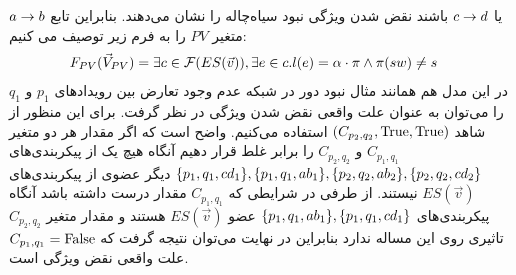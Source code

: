 $a \rightarrow b$
یا 
$c \rightarrow d$
باشند نقض شدن ویژگی نبود سیاه‌چاله را نشان می‌دهند.
بنابراین تابع متغیر
$PV$
را به فرم زیر توصیف می کنیم:
\begin{align*}
    F_{PV}(\vec V_{PV}) & = \exists c \in \mathcal{F}(ES(\vec v)),
    \exists e \in c. l(e) =  \alpha\cdot\pi \wedge \pi(sw) \neq s
\end{align*}
در این مدل هم همانند مثال نبود دور در شبکه عدم وجود تعارض بین رویداد‌های 
$p_1$
و
$q_1$
را می‌توان به عنوان علت واقعی نقض شدن ویژگی در نظر گرفت.
برای این منظور از شاهد
$(C_{p_2,q_2},\mathrm{True},\mathrm{True})$
استفاده می‌کنیم.
واضح است که اگر مقدار هر دو متغیر
$C_{p_1,q_1}$
و
$C_{p_2,q_2}$
را برابر غلط قرار دهیم آنگاه هیچ یک از پیکر‌بندی‌های 
$\{p_1,q_1,cd_1\},\{p_1,q_1,ab_1\},\{p_2,q_2,ab_2\},\{p_2,q_2,cd_2\}$
دیگر عضوی از پیکربندی‌های 
$ES(\vec v)$
نیستند.
از طرفی در شرایطی که 
$C_{p_1,q_1}$
مقدار درست داشته باشد آنگاه پیکربندی‌های
$\{p_1,q_1,ab_1\},\{p_1,q_1,cd_1\}$
عضو
$ES(\vec v)$
هستند و مقدار متغیر
$C_{p_2,q_2}$
تاثیری روی این مساله ندارد بنابراین در نهایت می‌توان نتیجه گرفت که 
$C_{p_1,q_1} = \mathrm{False}$
علت واقعی نقض ویژگی است.